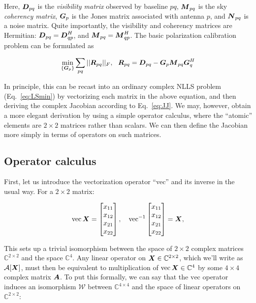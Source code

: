 \documentclass[useAMS,usenatbib]{mn2e}
\newcommand{\COMPLEX}{\mathbb{C}}
\newcommand{\mat}[1]{{\bmath{#1}}}
\newcommand{\DD}{\mat{D}}
\newcommand{\MM}{\mat{M}}
\newcommand{\RR}{\mat{R}}
\newcommand{\GG}{\mat{G}}
\begin{document}
Here, $\DD_{pq}$ is the \emph{visibility matrix} observed by baseline $pq$, $\MM_{pq}$ is the sky \emph{coherency matrix}, $\GG_p$ is the Jones matrix associated with antenna $p$, and $\mat{N}_{pq}$ is a noise matrix. Quite importantly, the visibility and coherency matrices are Hermitian: 
$\DD_{pq}=\DD^H_{qp}$, and $\MM_{pq}=\MM^H_{qp}$. The basic polarization calibration problem can be formulated as

\begin{equation}
\label{eq:cal:DI:pol}
\min_{\{\GG_p\}}\sum_{pq}||\RR_{pq}||_F,~~
\RR_{pq} = \DD_{pq}-\GG_p \MM_{pq} \GG^H_q
\end{equation}



In principle, this can be recast into an ordinary complex NLLS problem (Eq.~\ref{eq:LSmin}) by vectorizing each 
matrix in the above equation,  and then deriving the complex Jacobian according to Eq.~\ref{eq:JJ}. We may, however, 
obtain a more elegant derivation by using a simple operator calculus, where the ``atomic'' elements are $2\times2$ matrices 
rather than scalars. We can then define the Jacobian more simply in terms of operators on such matrices. 

\subsection{Operator calculus}

First, let us introduce the vectorization operator ``vec'' and its inverse in the usual way. For a $2\times2$ matrix:

\newcommand{\VEC}[1]{\mathrm{vec}\,{#1}}
\newcommand{\VECINV}[1]{\mathrm{vec}^{-1}\,{#1}}

\[
\VEC{\mat{X}} = \Matrix{c}{x_{11}\\x_{12}\\x_{21}\\x_{22}},~~~
\VECINV{\Matrix{c}{x_{11}\\x_{12}\\x_{21}\\x_{22}}} = \mat{X},
\]

This sets up a trivial isomorphism between the space of $2\times2$ complex matrices $\COMPLEX^{2\times2}$ and the space 
$\COMPLEX^4$. Any linear operator on $\mat{X} \in \COMPLEX^{2\times2}$, which we'll write as $\mathcal{A}[\mat{X}]$, 
must then be equivalent to  multiplication of $\VEC{\mat{X}} \in \COMPLEX^4$ by some $4\times 4$ complex matrix $\mat A$. To put this formally, we can say that the $\mathrm{vec}$ operator induces an isomorphism  $\mathcal{W}$ 
between $\COMPLEX^{4\times4}$ and the space of linear 
operators on $\COMPLEX^{2\times2}$:
\end{document}
